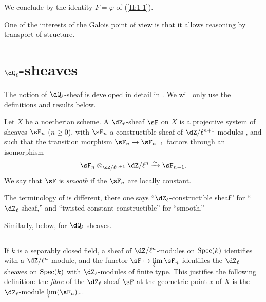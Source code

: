 We conclude by the identity $F=\varphi$ of (\ref{II:1-1}).

One of the interests of the Galois point of view is that it allows reasoning by
transport of structure.










\section{\texorpdfstring{$\dQ_\ell$}{Ql}-sheaves}\label{II:2}

The notion of $\dQ_\ell$-sheaf is developed in detail in
\cite[V,VI]{sga5}. We will only use the definitions and results
below.




\begin{definition_}\label{II:2-1}
Let $X$ be a noetherian scheme. A $\dZ_\ell$-sheaf $\sF$ on $X$ is a
projective system of sheaves $\sF_n$ ($n\geqslant 0$), with $\sF_n$ a
constructible sheaf of $\dZ/\ell^{n+1}$-modules \cite[IX.2]{sga4}, and such that
the transition morphism $\sF_n\to\sF_{n-1}$ factors through an isomorphism
\[
  \sF_n\otimes_{\dZ/\ell^{n+1}} \dZ/\ell^n \iso \sF_{n-1}\text{.}
\]
We say that $\sF$ is \emph{smooth} if the $\sF_n$ are locally constant.
\end{definition_}

The terminology of \cite{sga5} is different, there one says ``$\dZ_\ell$-constructible
sheaf'' for ``$\dZ_\ell$-sheaf,'' and ``twisted constant
constructible'' for ``smooth.''

Similarly, below, for $\dQ_\ell$-sheaves.




\subsection{}\label{II:2-2}

If $k$ is a separably closed field, a sheaf of $\dZ/\ell^n$-modules
on $\operatorname{Spec}(k)$ identifies with a $\dZ/\ell^n$-module, and the functor
$\sF\mapsto \varprojlim \sF_n$ identifies the $\dZ_\ell$-sheaves on
$\operatorname{Spec}(k)$ with $\dZ_\ell$-modules of finite type. This justifies the following
definition: the \emph{fibre} of the $\dZ_\ell$-sheaf $\sF$ at the
geometric point $x$ of $X$ is the $\dZ_\ell$-module $\varprojlim (\sF_n)_x$.




\subsection{}\label{II:2-3}

